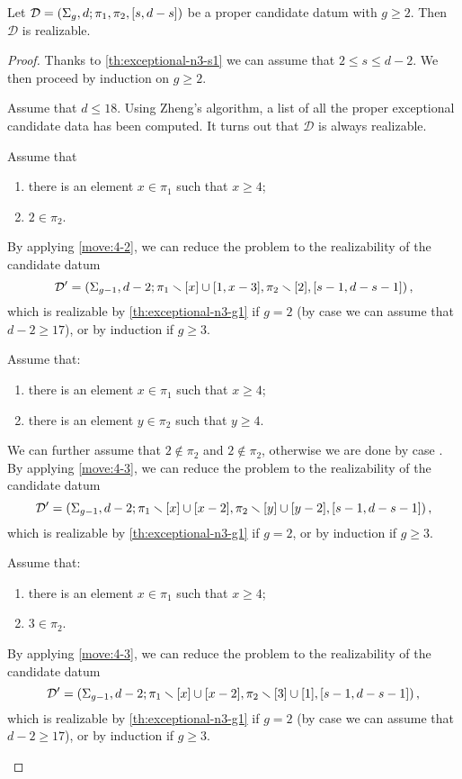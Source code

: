 \documentclass{article}
\begin{document}
\begin{theorem}
Let $\mathcal{D}=\left(\Sigma_g,d;\pi_1,\pi_2,[s,d-s]\right)$ be a proper candidate datum with $g\ge 2$. Then $\mathcal{D}$ is realizable.
\end{theorem}
\begin{proof}
Thanks to \cref{th:exceptional-n3-s1} we can assume that $2\le s\le d-2$. We then proceed by induction on $g\ge 2$.

\begin{manycases}
\case Assume that $d\le 18$. Using Zheng's algorithm, a list of all the proper exceptional candidate data has been computed. It turns out that $\mathcal{D}$ is always realizable.

\case Assume that
\begin{enumerate}
\item there is an element $x\in\pi_1$ such that $x\ge 4$;
\item $2\in\pi_2$.
\end{enumerate}
By applying \cref{move:4-2}, we can reduce the problem to the realizability of the candidate datum
\[
\mathcal{D}'=\left(\Sigma_{g-1},d-2;\pi_1\smallsetminus[x]\cup[1,x-3],\pi_2\smallsetminus[2],[s-1,d-s-1]\right),
\]
which is realizable by \cref{th:exceptional-n3-g1} if $g=2$ (by case  we can assume that $d-2\ge 17$), or by induction if $g\ge 3$.

\case Assume that:
\begin{enumerate}
\item there is an element $x\in\pi_1$ such that $x\ge 4$;
\item there is an element $y\in\pi_2$ such that $y\ge 4$.
\end{enumerate}
We can further assume that $2\not\in\pi_2$ and $2\not\in\pi_2$, otherwise we are done by case . By applying \cref{move:4-3}, we can reduce the problem to the realizability of the candidate datum
\[
\mathcal{D}'=\left(\Sigma_{g-1},d-2;\pi_1\smallsetminus[x]\cup[x-2],\pi_2\smallsetminus[y]\cup[y-2],[s-1,d-s-1]\right),
\]
which is realizable by \cref{th:exceptional-n3-g1} if $g=2$, or by induction if $g\ge 3$.

\case Assume that:
\begin{enumerate}
\item there is an element $x\in\pi_1$ such that $x\ge 4$;
\item $3\in\pi_2$.
\end{enumerate}
By applying \cref{move:4-3}, we can reduce the problem to the realizability of the candidate datum
\[
\mathcal{D}'=\left(\Sigma_{g-1},d-2;\pi_1\smallsetminus[x]\cup[x-2],\pi_2\smallsetminus[3]\cup[1],[s-1,d-s-1]\right),
\]
which is realizable by \cref{th:exceptional-n3-g1} if $g=2$ (by case  we can assume that $d-2\ge 17$), or by induction if $g\ge 3$.


\end{manycases}
\end{proof}
\end{document}
